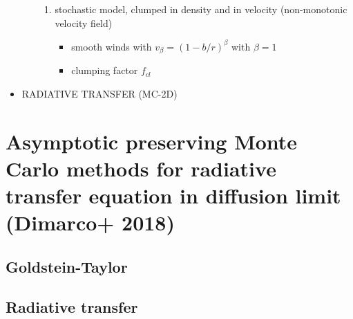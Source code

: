 \documentclass[../main/main.tex]{subfiles}
\begin{document}
\begin{itemize}
\begin{itemize}
\begin{enumerate}
\item stochastic model, clumped in density and in velocity (non-monotonic velocity field)
\begin{itemize}
\item smooth winds with $v_{\beta} = (1-b/r)^{\beta}$ with $\beta = 1$
\item clumping factor $f_{cl}$
\end{itemize}
\end{enumerate}

\end{itemize}

\item RADIATIVE TRANSFER (MC-2D)
\end{itemize}

\newpage
\section{Asymptotic preserving Monte Carlo methods for radiative transfer equation in diffusion limit (Dimarco+ 2018)}
\subsection{Goldstein-Taylor}
\subsection{Radiative transfer}
\end{document}
